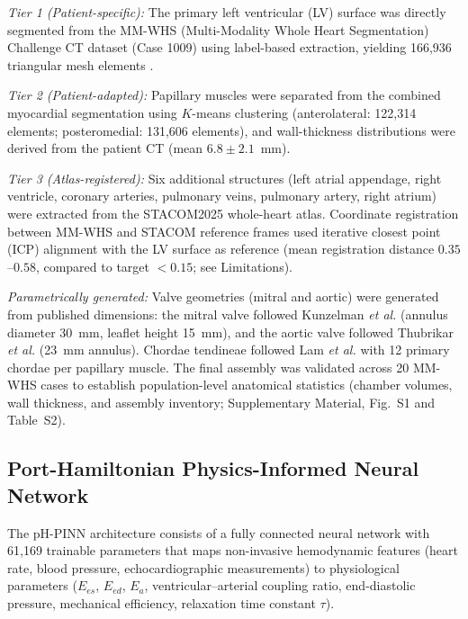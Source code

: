 \documentclass[journal]{IEEEtran}
\begin{document}
\emph{Tier 1 (Patient-specific):} The primary left ventricular (LV) surface was directly segmented from the MM-WHS (Multi-Modality Whole Heart Segmentation) Challenge CT dataset (Case 1009) using label-based extraction, yielding 166{,}936 triangular mesh elements \cite{zhuang2019}.

\emph{Tier 2 (Patient-adapted):} Papillary muscles were separated from the combined myocardial segmentation using $K$-means clustering (anterolateral: 122{,}314 elements; posteromedial: 131{,}606 elements), and wall-thickness distributions were derived from the patient CT (mean $6.8\pm2.1$~mm).

\emph{Tier 3 (Atlas-registered):} Six additional structures (left atrial appendage, right ventricle, coronary arteries, pulmonary veins, pulmonary artery, right atrium) were extracted from the STACOM2025 whole-heart atlas. Coordinate registration between MM-WHS and STACOM reference frames used iterative closest point (ICP) alignment with the LV surface as reference (mean registration distance $0.35$--$0.58$, compared to target $<0.15$; see Limitations).

\emph{Parametrically generated:} Valve geometries (mitral and aortic) were generated from published dimensions: the mitral valve followed Kunzelman \emph{et al.} \cite{kunzelman1994} (annulus diameter 30~mm, leaflet height 15~mm), and the aortic valve followed Thubrikar \emph{et al.} \cite{thubrikar1981} (23~mm annulus). Chordae tendineae followed Lam \emph{et al.} \cite{lam1970} with 12 primary chordae per papillary muscle. The final assembly was validated across 20 MM-WHS cases to establish population-level anatomical statistics (chamber volumes, wall thickness, and assembly inventory; Supplementary Material, Fig.~S1 and Table~S2).

\subsection{Port-Hamiltonian Physics-Informed Neural Network}\label{sec:pinn}
The pH-PINN architecture consists of a fully connected neural network with 61{,}169 trainable parameters that maps non-invasive hemodynamic features (heart rate, blood pressure, echocardiographic measurements) to physiological parameters ($E_{es}$, $E_{ed}$, $E_a$, ventricular--arterial coupling ratio, end-diastolic pressure, mechanical efficiency, relaxation time constant $\tau$).
\end{document}
